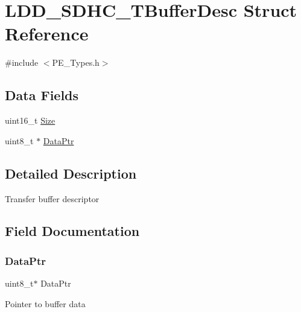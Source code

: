 \hypertarget{struct_l_d_d___s_d_h_c___t_buffer_desc}{}\section{L\+D\+D\+\_\+\+S\+D\+H\+C\+\_\+\+T\+Buffer\+Desc Struct Reference}
\label{struct_l_d_d___s_d_h_c___t_buffer_desc}


{\ttfamily \#include $<$P\+E\+\_\+\+Types.\+h$>$}

\subsection*{Data Fields}
\begin{DoxyCompactItemize}
\item 
uint16\+\_\+t \hyperlink{struct_l_d_d___s_d_h_c___t_buffer_desc_a7da24467a0654ce2d1b0d8d0a09eee4b}{Size}
\item 
uint8\+\_\+t $\ast$ \hyperlink{struct_l_d_d___s_d_h_c___t_buffer_desc_ad076d2b6eaae6f9b32363de4729e9349}{Data\+Ptr}
\end{DoxyCompactItemize}


\subsection{Detailed Description}
Transfer buffer descriptor 

\subsection{Field Documentation}
\mbox{\label{struct_l_d_d___s_d_h_c___t_buffer_desc_ad076d2b6eaae6f9b32363de4729e9349}} 
\subsubsection{\texorpdfstring{Data\+Ptr}{DataPtr}}
{\footnotesize\ttfamily uint8\+\_\+t$\ast$ Data\+Ptr}

Pointer to buffer data \mbox{\label{struct_l_d_d___s_d_h_c___t_buffer_desc_a7da24467a0654ce2d1b0d8d0a09eee4b}} 
